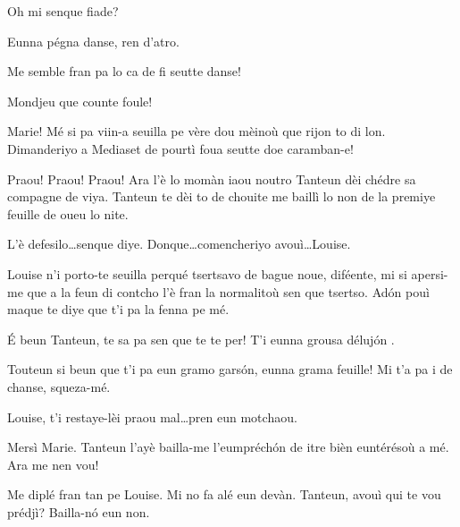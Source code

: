 \begin{drama}


\Alicespeaks{} Oh mi senque fiade?

\Tanteunspeaks Eunna pégna danse, ren d'atro.

\Sperancespeaks Me semble fran pa lo ca de fi seutte danse!

\Tanteunspeaks Mondjeu que counte foule!


\Alicespeaks Marie! Mé si pa viin-a seuilla pe vère dou mèinoù que rijon to di lon. Dimanderiyo a Mediaset de pourtì foua seutte doe caramban-e!

\Mariespeaks Praou! Praou! Praou! Ara l'è lo mo\-màn iaou noutro Tanteun dèi chédre sa compagne de viya. Tanteun te dèi to de chouite me baillì lo non de la premiye feuille de oueu lo nite.

\Tanteunspeaks{} L'è defesilo\ldots senque diye. Donque\ldots comencheriyo avouì\ldots Louise.


\Tanteunspeaks Louise n'i porto-te seuilla perqué tsertsavo de bague noue, diféente, mi si apersi-me que a la feun di contcho l'è fran la normalitoù sen que tsertso. Ad\'on pouì maque te diye que t'i pa la fenna pe mé.

\Louisespeaks {} \'E beun Tanteun, te sa pa sen que te te per! T'i eunna grousa déluj\'on .

\Tanteunspeaks Touteun si beun que t'i pa eun gramo gars\'on,  eunna grama feuille! Mi t'a pa i de chanse, squeza-mé.

\Mariespeaks Louise, t’i restaye-lèi praou mal\ldots pren eun motchaou.


\Louisespeaks Mersì Marie. Tanteun l’ayè bailla-me l’eumpréch\'on de itre bièn euntérésoù a mé. Ara me nen vou!


\Mariespeaks Me diplé fran tan pe Louise. Mi no fa alé eun devàn. Tanteun, avouì qui te vou prédjì? Bailla-n\'o eun non.


\end{drama}
